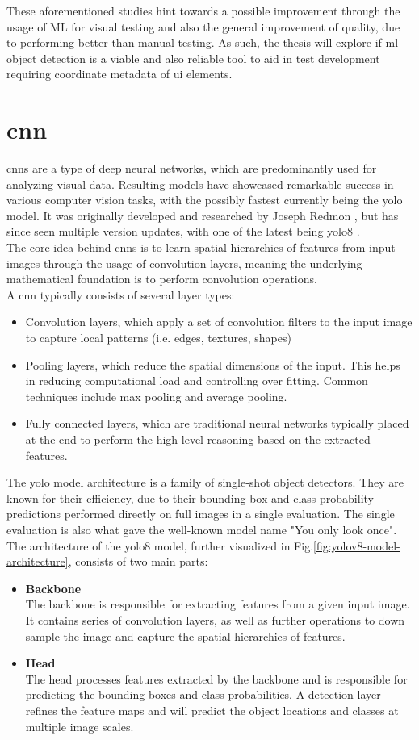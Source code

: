 \documentclass[Bachelor, BIC, english, fhCitStyle, IEEE]{BASE/twbook} %
\newcommand{\nocontentsline}[3]{}
\newcommand{\hidsection}[1]{\bgroup\let\addcontentsline=\nocontentsline\section{#1}\egroup}
\newcommand{\hidsubsection}[1]{\bgroup\let\addcontentsline=\nocontentsline\subsection{#1}\egroup}
\begin{document}
These aforementioned studies hint towards a possible improvement through the usage of ML for visual testing and also the general improvement of quality, due to performing better than manual testing. As such, the thesis will explore if \ac{ml} object detection is a viable and also reliable tool to aid in test development requiring coordinate metadata of \ac{ui} elements.
\newpage
\hidsection{\acf{cnn}}
\acp{cnn} are a type of deep neural networks, which are predominantly used for analyzing visual data. Resulting models have showcased remarkable success in various computer vision tasks, with the possibly fastest currently being the \ac{yolo} model. It was originally developed and researched by Joseph Redmon \autocite{redmonYouOnlyLook2016}, but has since seen multiple version updates, with one of the latest being \ac{yolo8} \autocite{jocherUltralyticsYOLO2023}.\\
The core idea behind \acp{cnn} is to learn spatial hierarchies of features from input images through the usage of convolution layers, meaning the underlying mathematical foundation is to perform convolution operations.\\
A \ac{cnn} typically consists of several layer types:
\begin{itemize}
    \item Convolution layers, which apply a set of convolution filters to the input image to capture local patterns (i.e. edges, textures, shapes)
    \item Pooling layers, which reduce the spatial dimensions of the input. This helps in reducing computational load and controlling over fitting. Common techniques include max pooling and average pooling.
    \item Fully connected layers, which are traditional neural networks typically placed at the end to perform the high-level reasoning based on the extracted features.
\end{itemize}
\hidsubsection{\acf{yolo} architecture}
The \ac{yolo} model architecture is a family of single-shot object detectors. They are known for their efficiency, due to their bounding box and class probability predictions performed directly on full images in a single evaluation. The single evaluation is also what gave the well-known model name "You only look once".\\
The architecture of the \ac{yolo8} model, further visualized in Fig.\ref{fig:yolov8-model-architecture}, consists of two main parts:
\begin{itemize}
    \item \textbf{Backbone}\\
    The backbone is responsible for extracting features from a given input image. It contains series of convolution layers, as well as further operations to down sample the image and  capture the spatial hierarchies of features.
    \item \textbf{Head}\\
    The head processes features extracted by the backbone and is responsible for predicting the bounding boxes and class probabilities. A detection layer refines the feature maps and will predict the object locations and classes at multiple image scales.
\end{itemize}
\end{document}
